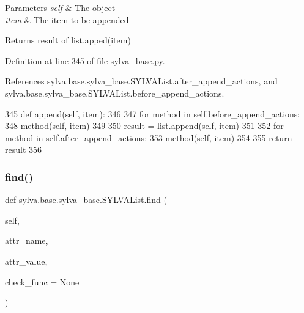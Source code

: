 \begin{DoxyParams}{Parameters}
{\em self} & The object \\
\hline
{\em item} & The item to be appended\\
\hline
\end{DoxyParams}
\begin{DoxyReturn}{Returns}
result of list.\+apped(item) 
\end{DoxyReturn}


Definition at line 345 of file sylva\+\_\+base.\+py.



References sylva.\+base.\+sylva\+\_\+base.\+S\+Y\+L\+V\+A\+List.\+after\+\_\+append\+\_\+actions, and sylva.\+base.\+sylva\+\_\+base.\+S\+Y\+L\+V\+A\+List.\+before\+\_\+append\+\_\+actions.


\begin{DoxyCode}
345     \textcolor{keyword}{def }append(self, item):
346 
347         \textcolor{keywordflow}{for} method \textcolor{keywordflow}{in} self.before\_append\_actions:
348             method(self, item)
349 
350         result = list.append(self, item)
351 
352         \textcolor{keywordflow}{for} method \textcolor{keywordflow}{in} self.after\_append\_actions:
353             method(self, item)
354 
355         \textcolor{keywordflow}{return} result
356 
\end{DoxyCode}
\mbox{\label{classsylva_1_1base_1_1sylva__base_1_1_s_y_l_v_a_list_a0e822d791dfa807d2bdacc2717b2420a}} 
\subsubsection{\texorpdfstring{find()}{find()}}
{\footnotesize\ttfamily def sylva.\+base.\+sylva\+\_\+base.\+S\+Y\+L\+V\+A\+List.\+find (\begin{DoxyParamCaption}\item[{}]{self,  }\item[{}]{attr\+\_\+name,  }\item[{}]{attr\+\_\+value,  }\item[{}]{check\+\_\+func = {\ttfamily None} }\end{DoxyParamCaption})}



